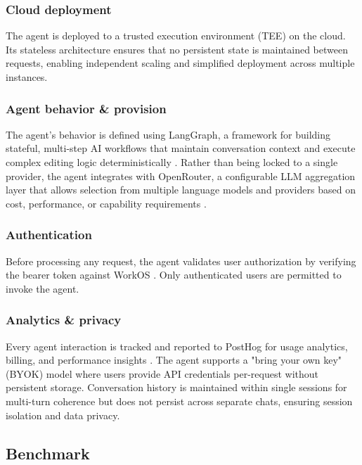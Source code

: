 \subsubsection{Cloud deployment}

The agent is deployed to a trusted execution environment (TEE) on the cloud.
Its stateless architecture ensures that no persistent state is maintained between requests, enabling independent scaling and simplified deployment across multiple instances.

\subsubsection{Agent behavior \& provision}

The agent's behavior is defined using LangGraph, a framework for building stateful, multi-step AI workflows that maintain conversation context and execute complex editing logic deterministically \cite{langgraph}.
Rather than being locked to a single provider, the agent integrates with OpenRouter, a configurable LLM aggregation layer that allows selection from multiple language models and providers based on cost, performance, or capability requirements \cite{openrouter}.

\subsubsection{Authentication}

Before processing any request, the agent validates user authorization by verifying the bearer token against WorkOS \cite{workos}.
Only authenticated users are permitted to invoke the agent.

\subsubsection{Analytics \& privacy}

Every agent interaction is tracked and reported to PostHog for usage analytics, billing, and performance insights \cite{posthog}. The agent supports a "bring your own key" (BYOK) model where users provide API credentials per-request without persistent storage.
Conversation history is maintained within single sessions for multi-turn coherence but does not persist across separate chats, ensuring session isolation and data privacy.


\subsection{Benchmark}

